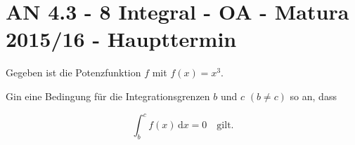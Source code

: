 \section{AN 4.3 - 8 Integral - OA - Matura 2015/16 - Haupttermin}

\begin{beispiel}[AN 4.3]{1} %
Gegeben ist die Potenzfunktion $f$ mit $f(x) = x^3$.\leer

Gin eine Bedingung für die Integrationsgrenzen $b$ und $c$ $(b \neq c)$ so an, dass

$$\int_{b}^{c}\! f(x)\, \mathrm{d}x=0 \quad \text{gilt.}$$ 


\end{beispiel}